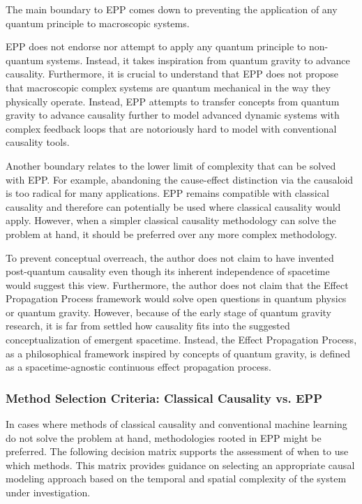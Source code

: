 \documentclass{article}
\begin{document}
The main boundary to EPP comes down to preventing the application of any quantum principle to macroscopic systems.

EPP does not endorse nor attempt to apply any quantum principle to non-quantum systems. Instead, it takes inspiration from quantum gravity to advance causality. Furthermore, it is crucial to understand that EPP does not propose that macroscopic complex systems are quantum mechanical in the way they physically operate. Instead, EPP attempts to transfer concepts from quantum gravity to advance causality further to model advanced dynamic systems with complex feedback loops that are notoriously hard to model with conventional causality tools.

Another boundary relates to the lower limit of complexity that can be solved with EPP. For example, abandoning the cause-effect distinction via the causaloid is too radical for many applications. EPP remains compatible with classical causality and therefore can potentially be used where classical causality would apply. However, when a simpler classical causality methodology can solve the problem at hand, it should be preferred over any more complex methodology.

To prevent conceptual overreach, the author does not claim to have invented post-quantum causality even though its inherent independence of spacetime would suggest this view. Furthermore, the author does not claim that the Effect Propagation Process framework would solve open questions in quantum physics or quantum gravity. However, because of the early stage of quantum gravity research, it is far from settled how causality fits into the suggested conceptualization of emergent spacetime. Instead, the Effect Propagation Process, as a philosophical framework inspired by concepts of quantum gravity, is defined as a spacetime-agnostic continuous effect propagation process.

\subsubsection{Method Selection Criteria: Classical Causality vs. EPP}

In cases where methods of classical causality and conventional machine learning do not solve the problem at hand, methodologies rooted in EPP might be preferred. The following decision matrix supports the assessment of when to use which methods. This matrix provides guidance on selecting an appropriate causal modeling approach based on the temporal and spatial complexity of the system under investigation.
\end{document}
